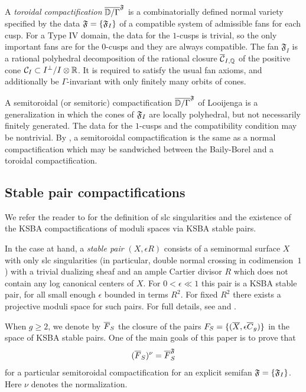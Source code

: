 \documentclass{amsart}
\begin{document}
A {\it toroidal compactification} $\overline{{\mathbb D}/\Gamma}^{\mathfrak F}$ is a
combinatorially defined normal variety specified by the data
${\mathfrak F}=\{{\mathfrak F}_I\}$ of a compatible system of admissible fans for each
cusp. For a Type IV domain, the data for the $1$-cusps is trivial, so
the only important fans are for the $0$-cusps and they are always
compatible. The fan $\mathfrak{F}_I$ is a rational polyhedral
decomposition of the rational closure $\overline{{\mathcal C}}_{I,{\mathbb Q}}$ of the positive
cone ${\mathcal C}_I\subset I^\perp/I\otimes {\mathbb R}$. It is required to satisfy
the usual fan axioms, and additionally be $\Gamma$-invariant
with only finitely many orbits of cones.

A semitoroidal (or semitoric) compactification
$\overline{{\mathbb D}/\Gamma}^{\mathfrak F}$ of Looijenga 
is a generalization in which the cones of ${\mathfrak F}_I$ are locally polyhedral,
but not necessarily finitely generated. The data for the $1$-cusps
and the compatibility condition may be nontrivial.
By \cite[Thm.~5.14]{alexeev2021compact},
a semitoroidal compactification is the same as a normal
compactification which may be sandwiched between the Baily-Borel and a
toroidal compactification.

\subsection{Stable pair compactifications}
\label{sec:ksba-compactifications}

We refer the reader to \cite{kollar2023families-of-varieties} for the
definition of slc singularities and the existence of the KSBA
compactifications of moduli spaces via KSBA stable pairs.  

In the case at hand, a {\it stable pair} $(X,\epsilon R)$ consists of a
seminormal surface $X$ with only slc singularities (in particular,
double normal crossing in codimension~$1$) with a trivial dualizing
sheaf and an ample Cartier divisor $R$ which does not
contain any log canonical centers of $X$. For $0<\epsilon\ll1$ this
pair is a KSBA stable pair, for all small enough $\epsilon$ bounded 
in terms $R^2$. For fixed $R^2$ there exists a projective moduli space
for such pairs.  For full details, see
\cite{alexeev2019stable-pair} and
\cite{alexeev2020compactifications-moduli}.

When $g\geq 2$, we denote by ${\overline F}_S$ the closure of the pairs
$F_S=\{({\overline X},\epsilon {\overline C}_g)\}$ in the space of KSBA stable pairs.
One of the main goals of this paper is to
prove that $$({\overline F}_S)^\nu = {\overline F}_S^{\mathfrak F}$$ 
for a particular semitoroidal compactification
for an explicit semifan ${\mathfrak F}=\{{\mathfrak F}_I\}$. Here $\nu$
denotes the normalization.
\end{document}
